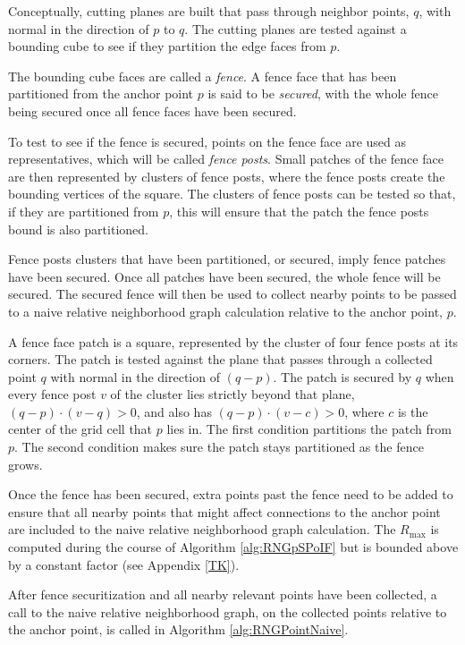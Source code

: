 \documentclass[a4paper,fleqn]{cas-dc}
\begin{document}
Conceptually, cutting planes are built that pass through neighbor points, $q$, with
normal in the direction of $p$ to $q$.
The cutting planes are tested against a bounding cube to see if they partition
the edge faces from $p$.

The bounding cube faces are called a \emph{fence}.
A fence face that has been partitioned from the anchor point $p$ is said to be \emph{secured},
with the whole fence being secured once all fence faces have been secured.

To test to see if the fence is secured, points on the fence face are used
as representatives, which will be called \emph{fence posts}.
Small patches of the fence face are then represented by clusters of fence posts,
where the fence posts create the bounding vertices of the square.
The clusters of fence posts can be tested so that, if they are partitioned
from $p$, this will ensure that the patch the fence posts bound is also partitioned.

Fence posts clusters that have been partitioned, or secured, imply
fence patches have been secured.
Once all patches have been secured, the whole fence will be secured.
The secured fence will then be used to collect nearby points to be
passed to a naive relative neighborhood graph calculation relative
to the anchor point, $p$.

A fence face patch is a square, represented by the cluster of four fence posts at its corners.
The patch is tested against the plane that passes through a collected point $q$ with normal
in the direction of $(q-p)$.
The patch is secured by $q$ when every fence post $v$ of the cluster lies strictly beyond that plane,
$(q-p) \cdot (v-q) > 0$, and also has $(q-p) \cdot (v-c) > 0$, where $c$ is the center of the grid cell
that $p$ lies in.
The first condition partitions the patch from $p$.
The second condition makes sure the patch stays partitioned as the fence grows.

Once the fence has been secured, extra points past the fence need to be
added to ensure that all nearby points that might affect connections to the
anchor point are included to the naive relative neighborhood graph calculation.
The $R _ {\text{max}}$ is computed during the course of
Algorithm \ref{alg:RNGpSPoIF} but is bounded above by a constant factor
(see Appendix \ref{TK}).

After fence securitization and all nearby relevant points have been collected,
a call to the naive relative neighborhood
graph, on the collected points relative to the anchor point, is called
in Algorithm \ref{alg:RNGPointNaive}.
\end{document}
